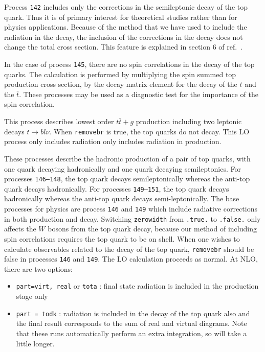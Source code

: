 Process {\tt 142} includes only the corrections in
the semileptonic decay of the top quark. Thus it is of primary
interest for theoretical studies rather than for physics applications.  
Because of the method that we have used to include the radiation in the decay,
the inclusion of the corrections in the decay does not change the
total cross section. This feature is explained in section 6 of ref.~\cite{Campbell:2012uf}.

In the case of process {\tt 145}, there are no spin correlations in
the decay of the top quarks. The calculation is performed by
multiplying the spin summed top production cross section, by the decay
matrix element for the decay of the $t$ and the $\bar{t}$. These
processes may be used as a diagnostic test for the importance of the
spin correlation.



This process describes lowest order $t \bar{t}+g$ production 
including two leptonic decays $t \to b l \nu$. 
When {\tt removebr} is true, the top quarks do not decay.
This LO process only includes radiation only includes radiation in production.


These processes describe the hadronic production of a pair of top
quarks, with one quark decaying hadronically and one quark decaying
semileptonics.  For processes {\tt 146--148}, the top quark decays
semileptonically whereas the anti-top quark decays hadronically.  For
processes {\tt 149--151}, the top quark decays hadronically whereas the
anti-top quark decays semi-leptonically.  The base processes for
physics are process {\tt 146} and {\tt 149} which include
radiative corrections in both production and decay.  Switching {\tt zerowidth} from 
{\tt .true.} to {\tt .false.} only affects the $W$ bosons from the top
quark decay, because our method of including spin correlations
requires the top quark to be on shell.
When one wishes to calculate observables related to the decay of the top
quark, {\tt removebr} should be false in processes {\tt 146} and {\tt 149}.
The LO calculation proceeds as normal. At NLO, there are two options:
\begin{itemize}
\item {\tt part=virt, real} or {\tt tota} : final state radiation is included
in the production stage only
\item {\tt part = todk} : radiation is included in the decay of the top
quark also and the final result corresponds to the sum of real and virtual
diagrams. 
Note that these runs automatically perform an extra integration, so
will take a little longer.
\end{itemize}


